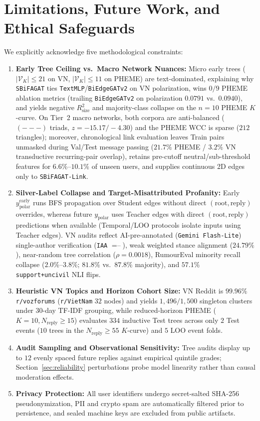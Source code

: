 \documentclass[conference]{IEEEtran}
\begin{document}
\section{Limitations, Future Work, and Ethical Safeguards}
We explicitly acknowledge five methodological constraints:
\begin{enumerate}
    \item \textbf{Early Tree Ceiling vs.\ Macro Network Nuances:} Micro early trees ($|\mathcal{V}_K| \le 21$ on VN, $|\mathcal{V}_K| \le 11$ on PHEME) are text-dominated, explaining why \texttt{SBiFAGAT} ties \texttt{TextMLP}/\texttt{BiEdgeGATv2} on VN polarization, wins $0/9$ PHEME ablation metrics (trailing \texttt{BiEdgeGATv2} on polarization $0.0791$ vs.\ $0.0940$), and yields negative $R^2_{\text{size}}$ and majority-class collapse on the $n=10$ PHEME $K$-curve. On Tier~2 macro networks, both corpora are anti-balanced ($(---)$ triads, $z = -15.17 / -4.30$) and the PHEME WCC is sparse ($212$ triangles); moreover, chronological link evaluation leaves Train pairs unmasked during Val/Test message passing ($21.7\%$ PHEME / $3.2\%$ VN transductive recurring-pair overlap), retains pre-cutoff neutral/sub-threshold features for $6.6\%$--$10.1\%$ of unseen users, and supplies continuous 2D edges only to \texttt{SBiFAGAT-Link}.
    \item \textbf{Silver-Label Collapse and Target-Misattributed Profanity:} Early $y_{\text{polar}}^{\text{early}}$ runs BFS propagation over Student edges without direct $(\text{root}, \text{reply})$ overrides, whereas future $y_{\text{polar}}$ uses Teacher edges with direct $(\text{root}, \text{reply})$ predictions when available (Temporal/LOO protocols isolate inputs using Teacher edges). VN audits reflect AI-pre-annotated (\texttt{Gemini Flash-Lite}) single-author verification (\texttt{IAA} $= \text{--}$), weak weighted stance alignment ($24.79\%$), near-random tree correlation ($\rho = 0.0018$), RumourEval minority recall collapse ($2.0\%$--$3.8\%$; $81.8\%$ vs.\ $87.8\%$ majority), and $57.1\%$ \texttt{support+uncivil} NLI flips.
    \item \textbf{Heuristic VN Topics and Horizon Cohort Size:} VN Reddit is $99.96\%$ \texttt{r/vozforums} (\texttt{r/VietNam} $32$ nodes) and yields $1{,}496/1{,}500$ singleton clusters under 30-day TF-IDF grouping, while reduced-horizon PHEME ($K=10, N_{\text{reply}} \ge 15$) evaluates $334$ inductive Test trees across only $2$ Test events ($10$ trees in the $N_{\text{reply}} \ge 55$ $K$-curve) and $5$ LOO event folds.
    \item \textbf{Audit Sampling and Observational Sensitivity:} Tree audits display up to $12$ evenly spaced future replies against empirical quintile grades; Section~\ref{sec:reliability} perturbations probe model linearity rather than causal moderation effects.
    \item \textbf{Privacy Protection:} All user identifiers undergo secret-salted SHA-256 pseudonymization, PII and crypto spam are automatically filtered prior to persistence, and sealed machine keys are excluded from public artifacts.
\end{enumerate}
\end{document}
